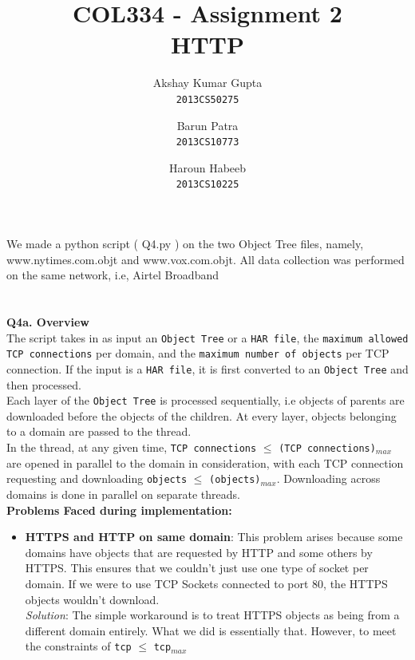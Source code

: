 \documentclass[12pt]{article}
\begin{document}
\title{COL334 - Assignment 2\\ HTTP}
\author{Akshay Kumar Gupta\\\texttt{2013CS50275} \and  Barun Patra\\\texttt{2013CS10773} \and Haroun Habeeb\\\texttt{2013CS10225}}
\date{}
\maketitle
\noindent 
We made a python script ( Q4.py ) on the two Object Tree files, namely, www.nytimes.com.objt and www.vox.com.objt. All data collection was performed on the same network, i.e, Airtel Broadband
\\\\\\
{\bfseries Q4a. Overview} %
\\The script takes in as input an \texttt{Object Tree} or a \texttt{HAR file}, the \texttt{maximum allowed TCP connections} per domain, and the \texttt{maximum number of objects} per TCP connection. If the input is a \texttt{HAR file}, it is first converted to an \texttt{Object Tree} and then processed. \\
Each layer of the \texttt{Object Tree} is processed sequentially, i.e objects of parents are downloaded before the objects of the children. At every layer, objects belonging to a domain are passed to the thread.\\ 
In the thread, at any given time, \texttt{TCP connections} $\leq$ \texttt{(TCP connections)$_{max}$} are opened in parallel to the domain in consideration, with each TCP connection requesting and downloading \texttt{objects} $\leq$ \texttt{(objects)$_{max}$}. Downloading across domains is done in parallel on separate threads.
\\
\textbf{Problems Faced during implementation:}
\begin{itemize}
\item \textbf{HTTPS and HTTP on same domain}: This problem arises because some domains have objects that are requested by HTTP and some others by HTTPS. This ensures that we couldn't just use one type of socket per domain. If we were to use TCP Sockets connected to port 80, the HTTPS objects wouldn't download.\\
\textit{Solution}: The simple workaround is to treat HTTPS objects as being from a different domain entirely. What we did is essentially that. However, to meet the constraints of \texttt{tcp} $\leq$ \texttt{tcp$_{max}$}

\end{itemize}
\end{document}
